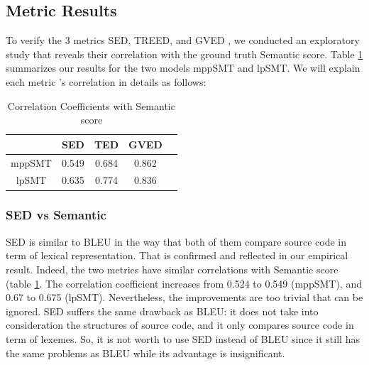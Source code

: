 \subsection{Metric Results}
To verify the 3 metrics SED, TREED, and GVED , we conducted an exploratory study that reveals their correlation with the ground truth Semantic score. Table \ref{table:correlation} summarizes our results for the two models mppSMT and lpSMT. We will explain each metric \rq s correlation in details as follows:

\begin{table}
\caption{Correlation Coefficients with Semantic score}
\begin{tabular}{|c|c|c|c|c|}
\hline
 & SED & TED & GVED\\
\hline
mppSMT  & 0.549 & 0.684 & 0.862 \\
lpSMT  & 0.635 & 0.774 & 0.836 \\
\hline
\end{tabular}
\label{table:correlation}
\end{table}


\subsubsection{\textbf{SED vs Semantic}}
SED is similar to BLEU in the way that both of them compare source code in term of lexical representation. That is confirmed and reflected in our empirical result. Indeed, the two metrics have similar correlations with Semantic score (table \ref{table:correlation}. The correlation coefficient increases from 0.524 to 0.549 (mppSMT), and 0.67 to 0.675 (lpSMT). Nevertheless, the improvements are too trivial that can be ignored. SED suffers the same drawback as BLEU: it does not take into consideration the structures of source code, and it only compares source code in term of lexemes. 
So, it is not worth to use SED instead of BLEU since it still has the same problems as BLEU while its advantage is insignificant. 

%


